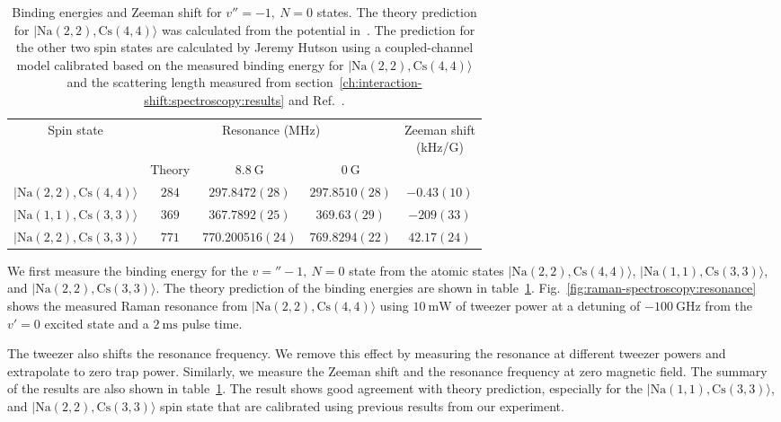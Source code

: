 \begin{table}
  \centering
  \caption[Binding energies for $v''=-1,\ N=0$ states]{
    Binding energies and Zeeman shift for $v''=-1,\ N=0$ states.
    The theory prediction for $|\mathrm{Na(2, 2),Cs(4, 4)}\rangle$
    was calculated from the potential in~\cite{docenko_coupling_2006}.
    The prediction for the other two spin states are calculated by Jeremy Hutson
    using a coupled-channel model calibrated based on the measured binding energy
    for $|\mathrm{Na(2, 2),Cs(4, 4)}\rangle$ and the scattering length
    measured from section~\ref{ch:interaction-shift:spectroscopy:results} and
    Ref.~\cite{hood_multichannel_2020}.
    \label{table:raman-spectroscopy:n0}}
  \begin{tabular}{|c|c|c|c|c|}
    \hline
    \multirow{2}{*}{Spin state}&\multicolumn{3}{c|}{Resonance (MHz)}&\multirowcell{2}{Zeeman shift\\(kHz/G)}\\\cline{2-4}
    {}&Theory&$8.8~\mathrm{G}$&$0~\mathrm{G}$&\\\hline
    $|\mathrm{Na(2, 2),Cs(4, 4)}\rangle$&$284$&$297.8472(28)$&$297.8510(28)$&$-0.43(10)$\\\hline
    $|\mathrm{Na(1, 1),Cs(3, 3)}\rangle$&$369$&$367.7892(25)$&$369.63(29)$&$-209(33)$\\\hline
    $|\mathrm{Na(2, 2),Cs(3, 3)}\rangle$&$771$&$770.200516(24)$&$769.8294(22)$&$42.17(24)$\\\hline
  \end{tabular}
\end{table}

We first measure the binding energy for the $v=''-1,\ N=0$ state
from the atomic states $|\mathrm{Na(2, 2),Cs(4, 4)}\rangle$, $|\mathrm{Na(1, 1),Cs(3, 3)}\rangle$,
and $|\mathrm{Na(2, 2),Cs(3, 3)}\rangle$.
The theory prediction of the binding energies are shown in
table~\ref{table:raman-spectroscopy:n0}.
Fig.~\ref{fig:raman-spectroscopy:resonance} shows the measured Raman resonance from
$|\mathrm{Na(2, 2),Cs(4, 4)}\rangle$ using $10~\mathrm{mW}$ of tweezer power at a detuning of
$-100~\mathrm{GHz}$ from the $v'=0$ excited state and a $2~\mathrm{ms}$ pulse time.

The tweezer also shifts the resonance frequency.
We remove this effect by measuring the resonance at different tweezer powers
and extrapolate to zero trap power.
Similarly, we measure the Zeeman shift and the resonance frequency at zero magnetic field.
The summary of the results are also shown in table~\ref{table:raman-spectroscopy:n0}.
The result shows good agreement with theory prediction,
especially for the $|\mathrm{Na(1, 1),Cs(3, 3)}\rangle$, and $|\mathrm{Na(2, 2),Cs(3, 3)}\rangle$
spin state that are calibrated using previous results from our experiment.

